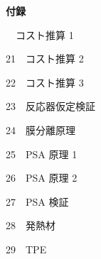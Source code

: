\begin{frame}[t]

  \vspace*{3.5mm}
  {\bfseries\large 付録}\par
  \vspace{0.9em}

  {\footnotesize\raggedright\linespread{1.45}　コスト推算 1\par
    21　コスト推算 2\par
    22　コスト推算 3\par
    23　反応器仮定検証\par
    24　膜分離原理\par
    25　PSA 原理 1\par
    26　PSA 原理 2\par
    27　PSA 検証\par
    28　発熱材\par
    29　TPE\par
  }

\end{frame}
